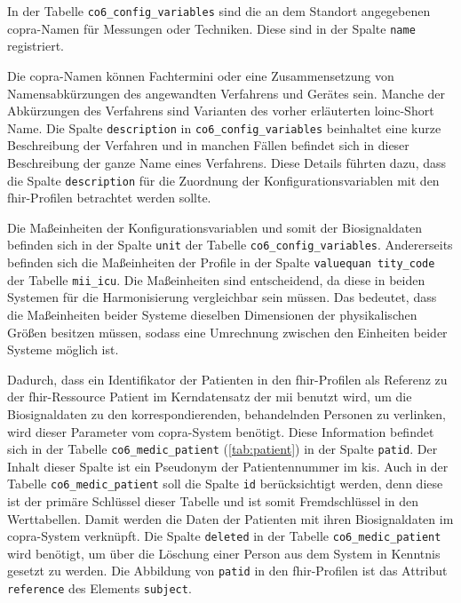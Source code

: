 In der Tabelle \texttt{co6\_config\_variables} sind die an dem Standort angegebenen \ac{copra}-Namen für Messungen oder Techniken. Diese sind in der Spalte \texttt{name} registriert. 

Die \ac{copra}-Namen können Fachtermini oder eine Zusammensetzung von Namensabkürzungen des angewandten Verfahrens und Gerätes sein. Manche der Abkürzungen des Verfahrens sind Varianten des vorher erläuterten \ac{loinc}-\glqq Short Name\grqq{}. Die Spalte \texttt{description} in \texttt{co6\_config\_variables} beinhaltet eine kurze Beschreibung der Verfahren und in manchen Fällen befindet sich in dieser Beschreibung der ganze Name eines Verfahrens. Diese Details führten dazu, dass die Spalte \texttt{description} für die Zuordnung der Konfigurationsvariablen mit den \ac{fhir}-Profilen betrachtet werden sollte.

Die Maßeinheiten der Konfigurationsvariablen und somit der Biosignaldaten befinden sich in der Spalte \texttt{unit} der Tabelle \texttt{co6\_config\_variables}. Andererseits befinden sich die Maßeinheiten der Profile in der Spalte \texttt{valuequan tity\_code} der Tabelle \texttt{mii\_icu}. Die Maßeinheiten sind entscheidend, da diese in beiden Systemen für die Harmonisierung vergleichbar sein müssen. Das bedeutet, dass die Maßeinheiten beider Systeme dieselben Dimensionen der physikalischen Größen besitzen müssen, sodass eine Umrechnung zwischen den Einheiten beider Systeme möglich ist.

Dadurch, dass ein Identifikator der Patienten in den \ac{fhir}-Profilen als Referenz zu der \ac{fhir}-Ressource \glqq Patient\grqq{} im Kerndatensatz der \ac{mii} benutzt wird, um die Biosignaldaten zu den korrespondierenden, behandelnden Personen zu verlinken, wird dieser Parameter vom \ac{copra}-System benötigt. Diese Information befindet sich in der Tabelle \texttt{co6\_medic\_patient} (\ref{tab:patient}) in der Spalte \texttt{patid}. Der Inhalt dieser Spalte ist ein Pseudonym der Patientennummer im \ac{kis}. Auch in der Tabelle \texttt{co6\_medic\_patient} soll die Spalte \texttt{id} berücksichtigt werden, denn diese ist der primäre Schlüssel dieser Tabelle und ist somit Fremdschlüssel in den Werttabellen. Damit werden die Daten der Patienten mit ihren Biosignaldaten im \ac{copra}-System verknüpft. Die Spalte \texttt{deleted} in der Tabelle \texttt{co6\_medic\_patient} wird benötigt, um über die Löschung einer Person aus dem System in Kenntnis gesetzt zu werden. Die Abbildung von \texttt{patid} in den \ac{fhir}-Profilen ist das Attribut \texttt{reference} des Elements \texttt{subject}.

